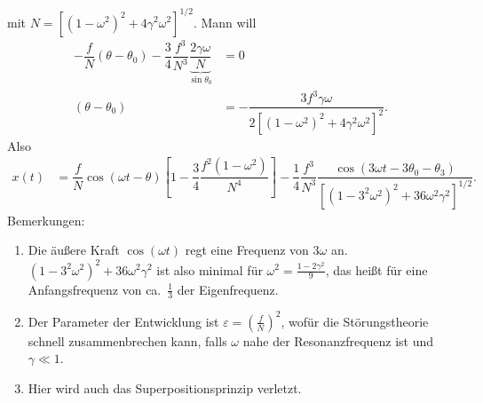 \documentclass[a4paper,12pt]{article}
\numberwithin{equation}{section}
\begin{document}
mit $N=\left[\left(1-\omega ^2\right)^2+4\gamma ^2\omega ^2\right]^{1/2}$. Mann will
\begin{align} 
        -\dfrac{f}{N}\left(\theta -\theta _0\right)-\dfrac{3}{4}\dfrac{f^3}{N^3}\underbrace{\dfrac{2\gamma \omega }{N}}_{\sin \theta _0}&=0\nonumber \\
        \left(\theta -\theta _0\right)&=-\dfrac{3f^3\gamma \omega }{2\left[\left(1-\omega ^2\right)^2+4\gamma ^2\omega ^2\right]^2}\label{eq:9.52}
.\end{align} 
Also
\begin{align} 
        x\left(t\right)&=\dfrac{f}{N}\cos \left(\omega t-\theta \right)\left[1-\dfrac{3}{4}\dfrac{f^2\left(1-\omega ^2\right)}{N^4}\right]-\dfrac{1}{4}\dfrac{f^3}{N^3}\dfrac{\cos \left(3\omega t-3\theta _0-\theta _3\right)}{\left[\left(1-3^2\omega ^2\right)^2+36\omega ^2\gamma ^2\right]^{1/2}}\label{eq:9.53}
.\end{align} 
Bemerkungen:
\begin{enumerate}[label=$\circ$]
        \item Die äußere Kraft $\cos \left(\omega t\right)$ regt eine Frequenz von $3\omega $ an. $\left(1-3^2\omega ^2\right)^2+36\omega ^2\gamma ^2$ ist also minimal für $\omega ^2=\tfrac{1-2\gamma ^2}{9}$, das heißt für eine Anfangsfrequenz von ca.\ $\tfrac{1}{3}$ der Eigenfrequenz.
        \item Der Parameter der Entwicklung ist $\varepsilon =\left(\tfrac{f}{N}\right)^2$, wofür die Störungstheorie schnell zusammenbrechen kann, falls $\omega $ nahe der Resonanzfrequenz ist und $\gamma \ll 1$.
        \item Hier wird auch das Superpositionsprinzip verletzt.
\end{enumerate}
\end{document}
